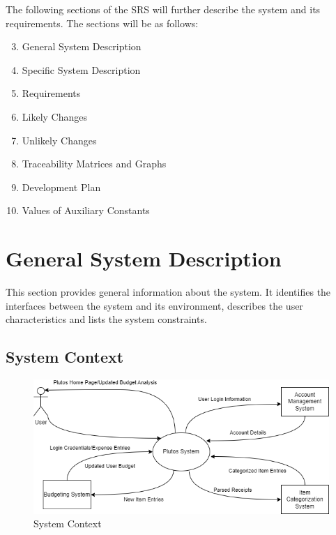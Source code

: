 \documentclass[12pt]{article}
\begin{document}
The following sections of the SRS will further describe the system and its requirements. The sections will be as follows:

\begin{enumerate}
	\setcounter{enumi}{2}
	\item General System Description
	\item Specific System Description
	\item Requirements
	\item Likely Changes
	\item Unlikely Changes
	\item Traceability Matrices and Graphs
	\item Development Plan
	\item Values of Auxiliary Constants
\end{enumerate}

\newpage

\section{General System Description}

This section provides general information about the system.  It identifies the
interfaces between the system and its environment, describes the user
characteristics and lists the system constraints.

\subsection{System Context}

\begin{figure}[h!]
  \centering
   \includegraphics[width=\textwidth]{SystemContext.png}
  \caption{System Context}
  \label{Fig_SystemContext} 
\end{figure}
\end{document}
